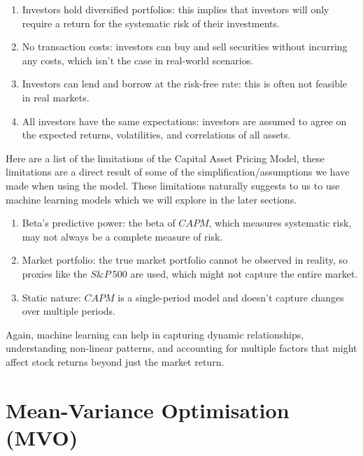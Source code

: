 \documentclass[a4paper,12pt,titlepage]{article}
\numberwithin{equation}{section}
\begin{document}
	\begin{enumerate}
		
		\item Investors hold diversified portfolios: this implies that investors will only require a 
			return for the systematic risk of their investments.

		\item No transaction costs: investors can buy and sell securities without incurring any costs, 
			which isn't the case in real-world scenarios.

		\item Investors can lend and borrow at the risk-free rate: this is often not feasible in 
			real markets.
		
		\item All investors have the same expectations: investors are assumed to agree on the expected 
			returns, volatilities, and correlations of all assets.
	
	\end{enumerate}
	
	Here are a list of the limitations of the Capital Asset Pricing Model, these limitations are a direct
	result of some of the simplification/assumptions we have made when using the model. These limitations 
	naturally suggests to us to use machine learning models which we will explore in the later sections.

	\begin{enumerate}

		\item Beta's predictive power: the beta of $CAPM$, which measures systematic risk, may not 
			always be a complete measure of risk.
		
		\item Market portfolio: the true market portfolio cannot be observed in reality, so 
			proxies like the $S\&P ~ 500$ are used, which might not capture the entire market.
			
		\item Static nature: $CAPM$ is a single-period model and doesn't capture changes over 
			multiple periods.
	
	\end{enumerate}
		
	Again, machine learning can help in capturing dynamic relationships, understanding non-linear 
	patterns, and accounting for multiple factors that might affect stock returns beyond just the 
	market return.

\section{Mean-Variance Optimisation (MVO)}
\label{Mean-Variance Optimisation}
\end{document}
